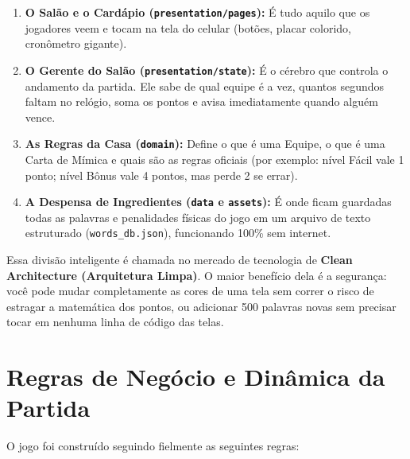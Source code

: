 \documentclass[12pt,a4paper]{article}
\begin{document}
\begin{enumerate}[label=\textbf{\arabic*.}]
  \item \textbf{O Salão e o Cardápio (\texttt{presentation/pages}):} É tudo aquilo que os jogadores veem e tocam na tela do celular (botões, placar colorido, cronômetro gigante).
  \item \textbf{O Gerente do Salão (\texttt{presentation/state}):} É o cérebro que controla o andamento da partida. Ele sabe de qual equipe é a vez, quantos segundos faltam no relógio, soma os pontos e avisa imediatamente quando alguém vence.
  \item \textbf{As Regras da Casa (\texttt{domain}):} Define o que é uma Equipe, o que é uma Carta de Mímica e quais são as regras oficiais (por exemplo: nível Fácil vale 1 ponto; nível Bônus vale 4 pontos, mas perde 2 se errar).
  \item \textbf{A Despensa de Ingredientes (\texttt{data} e \texttt{assets}):} É onde ficam guardadas todas as palavras e penalidades físicas do jogo em um arquivo de texto estruturado (\texttt{words\_db.json}), funcionando 100\% sem internet.
\end{enumerate}

Essa divisão inteligente é chamada no mercado de tecnologia de \textbf{Clean Architecture (Arquitetura Limpa)}. O maior benefício dela é a segurança: você pode mudar completamente as cores de uma tela sem correr o risco de estragar a matemática dos pontos, ou adicionar 500 palavras novas sem precisar tocar em nenhuma linha de código das telas.

\section{Regras de Negócio e Dinâmica da Partida}

O jogo foi construído seguindo fielmente as seguintes regras:
\end{document}
